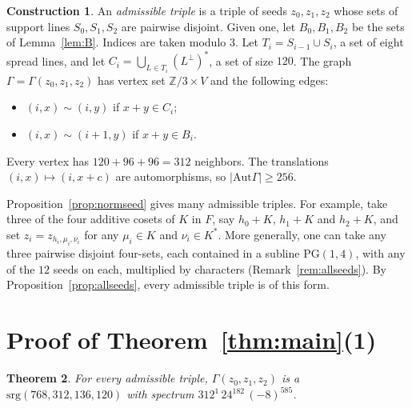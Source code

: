 \documentclass[11pt]{amsart}
\newtheorem{theorem}{Theorem}[section]
\theoremstyle{definition}
\newtheorem{construction}[theorem]{Construction}
\newcommand{\PG}{\mathrm{PG}}
\newcommand{\srg}{\mathrm{srg}}
\newcommand{\Aut}{\mathrm{Aut}}
\begin{document}
\begin{construction}\label{con:graph}
An \emph{admissible triple} is a triple of seeds $z_0,z_1,z_2$ whose sets of support lines $S_0,S_1,S_2$ are pairwise disjoint. Given one, let $B_0,B_1,B_2$ be the sets of Lemma~\ref{lem:B}. Indices are taken modulo $3$. Let $T_i=S_{i-1}\cup S_i$, a set of eight spread lines, and let $C_i=\bigcup_{L\in T_i}(L^\perp)^*$, a set of size $120$. The graph $\Gamma=\Gamma(z_0,z_1,z_2)$ has vertex set $\mathbb{Z}/3\times V$ and the following edges:
\begin{itemize}
\item $(i,x)\sim(i,y)$ if $x+y\in C_i$;
\item $(i,x)\sim(i+1,y)$ if $x+y\in B_i$.
\end{itemize}
\end{construction}

Every vertex has $120+96+96=312$ neighbors. The translations $(i,x)\mapsto(i,x+c)$ are automorphisms, so $|\Aut\Gamma|\ge256$.

Proposition~\ref{prop:normseed} gives many admissible triples. For example, take three of the four additive cosets of $K$ in $F$, say $h_0+K$, $h_1+K$ and $h_2+K$, and set $z_i=z_{h_i,\mu_i,\nu_i}$ for any $\mu_i\in K$ and $\nu_i\in K^*$. More generally, one can take any three pairwise disjoint four-sets, each contained in a subline $\PG(1,4)$, with any of the $12$ seeds on each, multiplied by characters (Remark~\ref{rem:allseeds}). By Proposition~\ref{prop:allseeds}, every admissible triple is of this form.

\section{Proof of Theorem~\ref{thm:main}(1)}\label{sec:proof}

\begin{theorem}\label{thm:srg}
For every admissible triple, $\Gamma(z_0,z_1,z_2)$ is a $\srg(768,312,136,120)$ with spectrum $312^1\,24^{182}\,(-8)^{585}$.
\end{theorem}
\end{document}
